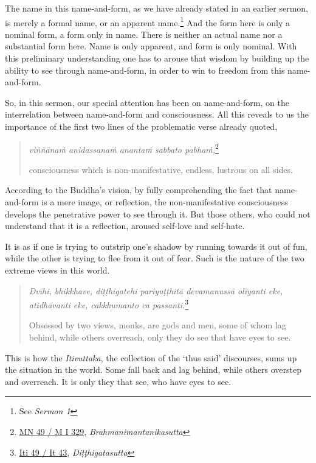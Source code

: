The name in this name-and-form, as we have already stated in an earlier sermon, is merely a formal name, or an apparent name.\footnote{See \emph{Sermon 1}} And the form here is only a nominal form, a form only in name. There is neither an actual name nor a substantial form here. Name is only apparent, and form is only nominal. With this preliminary understanding one has to arouse that wisdom by building up the ability to see through name-and-form, in order to win to freedom from this name-and-form.

So, in this sermon, our special attention has been on name-and-form, on the interrelation between name-and-form and consciousness. All this reveals to us the importance of the first two lines of the problematic verse already quoted,

\clearpage

\begin{quote}
\emph{viññānaṁ anidassanaṁ anantaṁ sabbato pabhaṁ,}\footnote{\href{https://suttacentral.net/mn49/pli/ms}{MN 49 / M I 329}, \emph{Brahmanimantanikasutta}}

consciousness which is non-manifestative, endless, lustrous on all sides.
\end{quote}

According to the Buddha's vision, by fully comprehending the fact that name-and-form is a mere image, or reflection, the non-manifestative consciousness develops the penetrative power to see through it. But those others, who could not understand that it is a reflection, aroused self-love and self-hate.

It is as if one is trying to outstrip one's shadow by running towards it out of fun, while the other is trying to flee from it out of fear. Such is the nature of the two extreme views in this world.

\begin{quote}
\emph{Dvīhi, bhikkhave, diṭṭhigatehi pariyuṭṭhitā devamanussā olīyanti eke, atidhāvanti eke, cakkhumanto ca passanti.}\footnote{\href{https://suttacentral.net/iti49/pli/ms}{Iti 49 / It 43}, \emph{Diṭṭhigatasutta}}

Obsessed by two views, monks, are gods and men, some of whom lag behind, while others overreach, only they do see that have eyes to see.
\end{quote}

This is how the \emph{Itivuttaka}, the collection of the `thus said' discourses, sums up the situation in the world. Some fall back and lag behind, while others overstep and overreach. It is only they that see, who have eyes to see.
